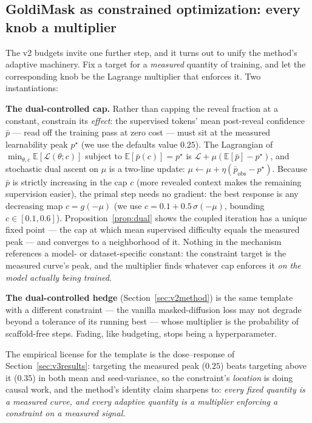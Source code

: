 \documentclass{article} %
\begin{document}
\subsection{GoldiMask as constrained optimization: every knob a multiplier}
\label{sec:lagrangian}

The v2 budgets invite one further step, and it turns out to unify the method's adaptive machinery. Fix a target for a \emph{measured} quantity of training, and let the corresponding knob be the Lagrange multiplier that enforces it. Two instantiations:

\textbf{The dual-controlled cap.} Rather than capping the reveal fraction at a constant, constrain its \emph{effect}: the supervised tokens' mean post-reveal confidence $\bar p$ --- read off the training pass at zero cost --- must sit at the measured learnability peak $p^\star$ (we use the defaults value $0.25$). The Lagrangian of $\min_{\theta, c} \mathbb{E}[\mathcal{L}(\theta; c)]$ subject to $\mathbb{E}[\bar p(c)] = p^\star$ is $\mathcal{L} + \mu(\mathbb{E}[\bar p] - p^\star)$, and stochastic dual ascent on $\mu$ is a two-line update: $\mu \leftarrow \mu + \eta(\bar p_{\text{obs}} - p^\star)$. Because $\bar p$ is strictly increasing in the cap $c$ (more revealed context makes the remaining supervision easier), the primal step needs no gradient: the best response is any decreasing map $c = g(-\mu)$ (we use $c = 0.1 + 0.5\,\sigma(-\mu)$, bounding $c \in [0.1, 0.6]$). Proposition~\ref{prop:dual} shows the coupled iteration has a unique fixed point --- the cap at which mean supervised difficulty equals the measured peak --- and converges to a neighborhood of it. Nothing in the mechanism references a model- or dataset-specific constant: the constraint target is the measured curve's peak, and the multiplier finds whatever cap enforces it \emph{on the model actually being trained}.

\textbf{The dual-controlled hedge} (Section~\ref{sec:v2method}) is the same template with a different constraint --- the vanilla masked-diffusion loss may not degrade beyond a tolerance of its running best --- whose multiplier is the probability of scaffold-free steps. Fading, like budgeting, stops being a hyperparameter.

The empirical license for the template is the dose--response of Section~\ref{sec:v3results}: targeting the measured peak ($0.25$) beats targeting above it ($0.35$) in both mean and seed-variance, so the constraint's \emph{location} is doing causal work, and the method's identity claim sharpens to: \emph{every fixed quantity is a measured curve, and every adaptive quantity is a multiplier enforcing a constraint on a measured signal.}
\end{document}
